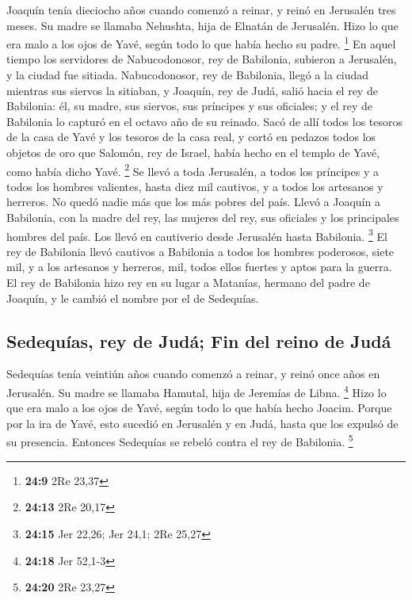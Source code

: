 \begin{paracol}{2}
 Joaquín tenía dieciocho años cuando comenzó a reinar, y
reinó en Jerusalén tres meses. Su madre se llamaba Nehushta, hija de
Elnatán de Jerusalén.  Hizo lo que era malo a los ojos de
Yavé, según todo lo que había hecho su padre. \footnote{\textbf{24:9}
  2Re 23,37}  En aquel tiempo los servidores de
Nabucodonosor, rey de Babilonia, subieron a Jerusalén, y la ciudad fue
sitiada.  Nabucodonosor, rey de Babilonia, llegó a la
ciudad mientras sus siervos la sitiaban,  y Joaquín, rey
de Judá, salió hacia el rey de Babilonia: él, su madre, sus siervos, sus
príncipes y sus oficiales; y el rey de Babilonia lo capturó en el octavo
año de su reinado.  Sacó de allí todos los tesoros de la
casa de Yavé y los tesoros de la casa real, y cortó en pedazos todos los
objetos de oro que Salomón, rey de Israel, había hecho en el templo de
Yavé, como había dicho Yavé. \footnote{\textbf{24:13} 2Re 20,17}
 Se llevó a toda Jerusalén, a todos los príncipes y a
todos los hombres valientes, hasta diez mil cautivos, y a todos los
artesanos y herreros. No quedó nadie más que los más pobres del país.
 Llevó a Joaquín a Babilonia, con la madre del rey, las
mujeres del rey, sus oficiales y los principales hombres del país. Los
llevó en cautiverio desde Jerusalén hasta Babilonia. \footnote{\textbf{24:15}
  Jer 22,26; Jer 24,1; 2Re 25,27}  El rey de Babilonia
llevó cautivos a Babilonia a todos los hombres poderosos, siete mil, y a
los artesanos y herreros, mil, todos ellos fuertes y aptos para la
guerra.  El rey de Babilonia hizo rey en su lugar a
Matanías, hermano del padre de Joaquín, y le cambió el nombre por el de
Sedequías.

\hypertarget{sedequuxedas-rey-de-juduxe1-fin-del-reino-de-juduxe1}{%
\subsection{Sedequías, rey de Judá; Fin del reino de
Judá}\label{sedequuxedas-rey-de-juduxe1-fin-del-reino-de-juduxe1}}

 Sedequías tenía veintiún años cuando comenzó a reinar, y
reinó once años en Jerusalén. Su madre se llamaba Hamutal, hija de
Jeremías de Libna. \footnote{\textbf{24:18} Jer 52,1-3} 
Hizo lo que era malo a los ojos de Yavé, según todo lo que había hecho
Joacim.  Porque por la ira de Yavé, esto sucedió en
Jerusalén y en Judá, hasta que los expulsó de su presencia. Entonces
Sedequías se rebeló contra el rey de Babilonia. \footnote{\textbf{24:20}
  2Re 23,27}


\end{paracol}
